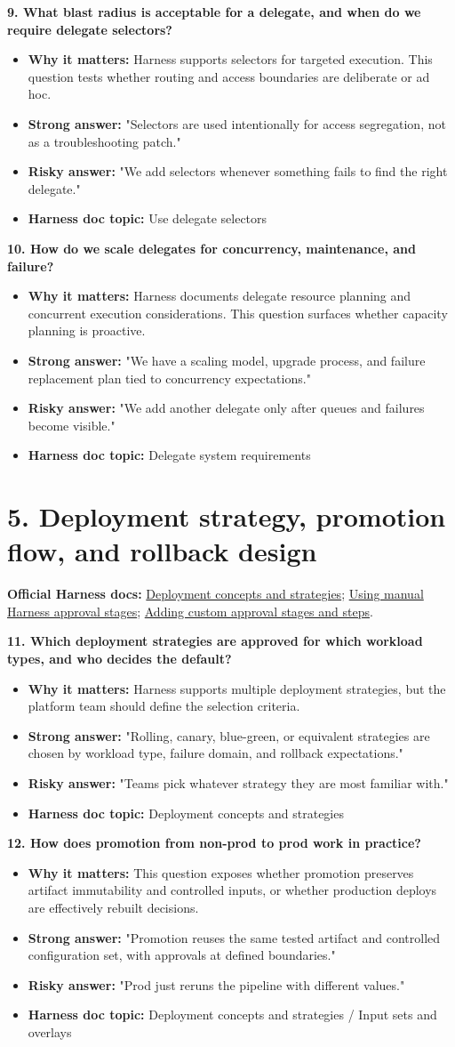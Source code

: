 \documentclass[11pt]{article}
\newcommand{\doccluster}[1]{%
  {\small\textcolor{AccentGray}{\textbf{Official Harness docs:} #1}}\par\vspace{0.4em}
}
\newcommand{\qblock}[5]{%
  \textbf{#1}\par
  \begin{itemize}[leftmargin=1.5em,itemsep=0.2em,topsep=0.3em]
    \item[--] \textbf{Why it matters:} #2
    \item[--] \textbf{Strong answer:} #3
    \item[--] \textbf{Risky answer:} #4
    \item[--] \textbf{Harness doc topic:} #5
  \end{itemize}
  \vspace{0.4em}
}
\begin{document}
\qblock{9. What blast radius is acceptable for a delegate, and when do we require delegate selectors?}{Harness supports selectors for targeted execution. This question tests whether routing and access boundaries are deliberate or ad hoc.}{"Selectors are used intentionally for access segregation, not as a troubleshooting patch."}{"We add selectors whenever something fails to find the right delegate."}{Use delegate selectors}

\qblock{10. How do we scale delegates for concurrency, maintenance, and failure?}{Harness documents delegate resource planning and concurrent execution considerations. This question surfaces whether capacity planning is proactive.}{"We have a scaling model, upgrade process, and failure replacement plan tied to concurrency expectations."}{"We add another delegate only after queues and failures become visible."}{Delegate system requirements}

\section*{5. Deployment strategy, promotion flow, and rollback design}
\doccluster{\href{https://developer.harness.io/docs/continuous-delivery/manage-deployments/deployment-concepts}{Deployment concepts and strategies}; \href{https://developer.harness.io/docs/platform/approvals/adding-harness-approval-stages}{Using manual Harness approval stages}; \href{https://developer.harness.io/docs/platform/approvals/custom-approvals}{Adding custom approval stages and steps}.}

\qblock{11. Which deployment strategies are approved for which workload types, and who decides the default?}{Harness supports multiple deployment strategies, but the platform team should define the selection criteria.}{"Rolling, canary, blue-green, or equivalent strategies are chosen by workload type, failure domain, and rollback expectations."}{"Teams pick whatever strategy they are most familiar with."}{Deployment concepts and strategies}

\qblock{12. How does promotion from non-prod to prod work in practice?}{This question exposes whether promotion preserves artifact immutability and controlled inputs, or whether production deploys are effectively rebuilt decisions.}{"Promotion reuses the same tested artifact and controlled configuration set, with approvals at defined boundaries."}{"Prod just reruns the pipeline with different values."}{Deployment concepts and strategies / Input sets and overlays}
\end{document}
